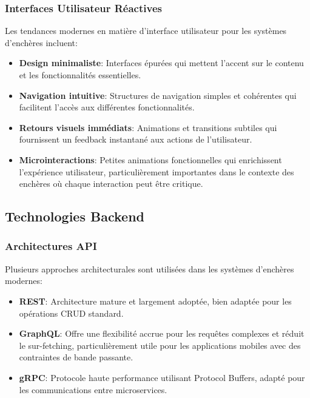 \subsubsection{Interfaces Utilisateur Réactives}

Les tendances modernes en matière d'interface utilisateur pour les systèmes d'enchères incluent:

\begin{itemize}
    \item \textbf{Design minimaliste}: Interfaces épurées qui mettent l'accent sur le contenu et les fonctionnalités essentielles.
    
    \item \textbf{Navigation intuitive}: Structures de navigation simples et cohérentes qui facilitent l'accès aux différentes fonctionnalités.
    
    \item \textbf{Retours visuels immédiats}: Animations et transitions subtiles qui fournissent un feedback instantané aux actions de l'utilisateur.
    
    \item \textbf{Microinteractions}: Petites animations fonctionnelles qui enrichissent l'expérience utilisateur, particulièrement importantes dans le contexte des enchères où chaque interaction peut être critique.
\end{itemize}

\subsection{Technologies Backend}

\subsubsection{Architectures API}

Plusieurs approches architecturales sont utilisées dans les systèmes d'enchères modernes:

\begin{itemize}
    \item \textbf{REST}: Architecture mature et largement adoptée, bien adaptée pour les opérations CRUD standard.
    
    \item \textbf{GraphQL}: Offre une flexibilité accrue pour les requêtes complexes et réduit le sur-fetching, particulièrement utile pour les applications mobiles avec des contraintes de bande passante.
    
    \item \textbf{gRPC}: Protocole haute performance utilisant Protocol Buffers, adapté pour les communications entre microservices.
\end{itemize}

